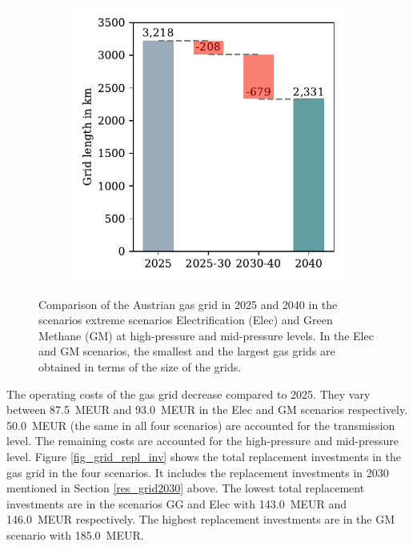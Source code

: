 \begin{figure}[h]
\begin{subfigure}[c]{0.5\textwidth}
		\vspace{-0.6cm}
		\label{Fig:c}
	\end{subfigure}
	\begin{subfigure}[c]{0.5\textwidth}
		\centering
		\includegraphics[width=1\linewidth]{figures/results/waterfall/waterfall_gm_mid.pdf}
		\vspace{-0.6cm}
		\label{Fig:d}
	\end{subfigure}
	\caption{Comparison of the Austrian gas grid in 2025 and 2040 in the scenarios extreme scenarios Electrification (Elec) and Green Methane (GM) at high-pressure and mid-pressure levels. In the Elec and GM scenarios, the smallest and the largest gas grids are obtained in terms of the size of the grids.}
	\label{fig_reduction_waterfall}
\end{figure}

The operating costs of the gas grid decrease compared to 2025. They vary between \SI{87.5}{MEUR} and \SI{93.0}{MEUR} in the Elec and GM scenarios respectively. \SI{50.0}{MEUR} (the same in all four scenarios) are accounted for the transmission level. The remaining costs are accounted for the high-pressure and mid-pressure level. Figure \ref{fig_grid_repl_inv} shows the total replacement investments in the gas grid in the four scenarios. It includes the replacement investments in 2030 mentioned in Section \ref{res_grid2030} above. The lowest total replacement investments are in the scenarios GG and Elec with \SI{143.0}{MEUR} and \SI{146.0}{MEUR} respectively. The highest replacement investments are in the GM scenario with \SI{185.0}{MEUR}. 

